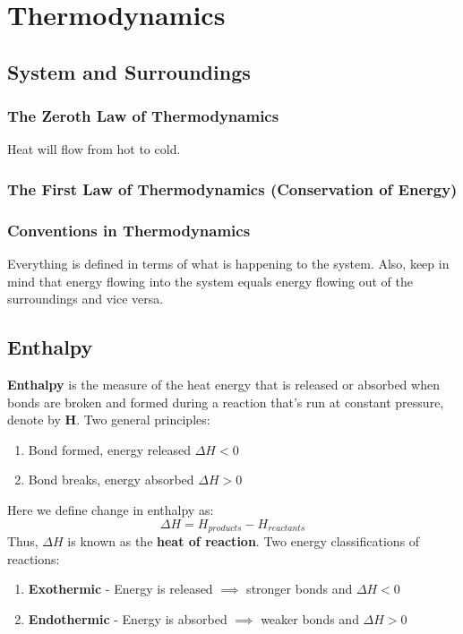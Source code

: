 \documentclass[../GChemReview.tex]{subfiles}
\begin{document}
	\chapter{Thermodynamics}
	
	\section{System and Surroundings}
	\subsection{The Zeroth Law of Thermodynamics}
	
	\hfil \newline
	Heat will flow from hot to cold. 
	
	\subsection{The First Law of Thermodynamics (Conservation of Energy)}
	
	
	\subsection{Conventions in Thermodynamics}
	
	Everything is defined in terms of what is happening to the system. Also, keep in mind that energy flowing into the system equals energy flowing out of the surroundings and vice versa.
	
	\section{Enthalpy}
	
	\textbf{Enthalpy} is the measure of the heat energy that is released or absorbed when bonds are broken and formed during a reaction that's run at constant pressure, denote by \textbf{H}. Two general principles:
	\begin{enumerate}
		\item Bond formed, energy released $ \Delta H < 0 $
		\item Bond breaks, energy absorbed $ \Delta H > 0 $
	\end{enumerate}
	Here we define change in enthalpy as:
	\begin{equation}
		\Delta H = H_{products} - H_{reactants}
	\end{equation}
	Thus, $ \Delta H $ is known as the \textbf{heat of reaction}. Two energy classifications of reactions:
	\begin{enumerate}
		\item \textbf{Exothermic} - Energy is released $ \implies $ stronger bonds and $ \Delta H < 0 $
		\item \textbf{Endothermic} - Energy is absorbed $ \implies $ weaker bonds and $ \Delta H > 0 $
	\end{enumerate}
	
\end{document}
